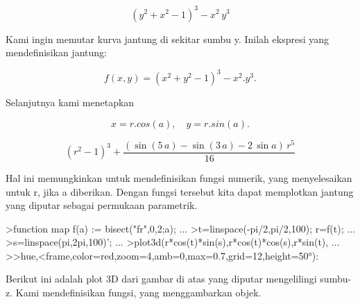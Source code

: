\documentclass[12pt,arial,letterpaper]{book}
\begin{document}
\begin{eulernootebook}
\begin{eulercomment}
\begin{eulercomment}
\begin{eulernootebook}
\begin{eulercomment}
\begin{eulercomment}
\begin{eulercomment}
\begin{eulercomment}
\begin{eulercomment}
\begin{eulercomment}
\begin{eulercomment}
\begin{eulernotebook}
\begin{eulerformula}
\[
\left(y^2+x^2-1\right)^3-x^2\,y^3
\]
\end{eulerformula}
\begin{eulercomment}
Kami ingin memutar kurva jantung di sekitar sumbu y. Inilah ekspresi
yang mendefinisikan jantung:

\end{eulercomment}
\begin{eulerformula}
\[
f(x,y)=(x^2+y^2-1)^3-x^2.y^3.
\]
\end{eulerformula}
\begin{eulercomment}
Selanjutnya kami menetapkan

\end{eulercomment}
\begin{eulerformula}
\[
x=r.cos(a),\quad y=r.sin(a).
\]
\end{eulerformula}
\begin{eulerformula}
\[
\left(r^2-1\right)^3+\frac{\left(\sin \left(5\,a\right)-\sin \left(
 3\,a\right)-2\,\sin a\right)\,r^5}{16}
\]
\end{eulerformula}
\begin{eulercomment}
Hal ini memungkinkan untuk mendefinisikan fungsi numerik, yang
menyelesaikan untuk r, jika a diberikan. Dengan fungsi tersebut kita
dapat memplotkan jantung yang diputar sebagai permukaan parametrik.
\end{eulercomment}
\begin{eulerprompt}
>function map f(a) := bisect("fr",0,2;a); ...
>t=linspace(-pi/2,pi/2,100); r=f(t);  ...
>s=linspace(pi,2pi,100)'; ...
>plot3d(r*cos(t)*sin(s),r*cos(t)*cos(s),r*sin(t), ...
>>hue,<frame,color=red,zoom=4,amb=0,max=0.7,grid=12,height=50°):
\end{eulerprompt}
\begin{eulercomment}
Berikut ini adalah plot 3D dari gambar di atas yang diputar
mengelilingi sumbu-z. Kami mendefinisikan fungsi, yang menggambarkan
objek.


\end{eulercomment}
\end{eulernotebook}
\end{eulercomment}
\end{eulercomment}
\end{eulercomment}
\end{eulercomment}
\end{eulercomment}
\end{eulercomment}
\end{eulercomment}
\end{eulernootebook}
\end{eulercomment}
\end{eulercomment}
\end{eulernootebook}
\end{document}
